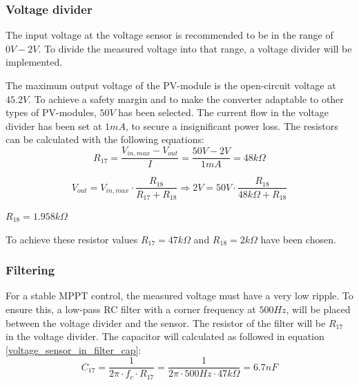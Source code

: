 \subsubsection{Voltage divider}
The input voltage at the voltage sensor is recommended to be in the range of $0V-2V$. To divide the measured voltage into that range, a voltage divider will be implemented. 

The maximum output voltage of the PV-module is the open-circuit voltage at $45.2V$. To achieve a safety margin and to make the converter adaptable to other types of PV-modules, $50V$ has been selected. The current flow in the voltage divider has been set at $1mA$, to secure a insignificant power loss. The resistors can be calculated with the following equations:
\begin{equation} \label{voltage_divider_R17_in}
	R_{17} = \frac{V_{in,max}-V_{out}}{I} = \frac{50V-2V}{1mA} = 48k\Omega
\end{equation}

\begin{equation} \label{voltage_divider_R18_in}
	V_{out} = V_{in,max} \cdot \frac{R_{18}}{R_{17}+R_{18}} \Rightarrow 2V = 50V \cdot \frac{R_{18}}{48k\Omega+R_{18}}
\end{equation}
\begin{center}
	$R_{18} = 1.958k\Omega$
\end{center}

To achieve these resistor values $R_{17} = 47k\Omega$ and $R_{18} = 2k\Omega$ have been chosen. 

\subsubsection{Filtering} \label{voltage_sensor_filter}
For a stable MPPT control, the measured voltage must have a very low ripple. To ensure this, a low-pass RC filter with a corner frequency at $500Hz$, will be placed between the voltage divider and the sensor. The resistor of the filter will be $R_{17}$ in the voltage divider. The capacitor will calculated as followed in equation \ref{voltage_sensor_in_filter_cap}:
\begin{equation} \label{voltage_sensor_in_filter_cap}
	C_{17} = \frac{1}{2\pi \cdot f_c \cdot R_{17}} = \frac{1}{2 \pi \cdot 500Hz \cdot 47k\Omega} = 6.7nF
\end{equation}

